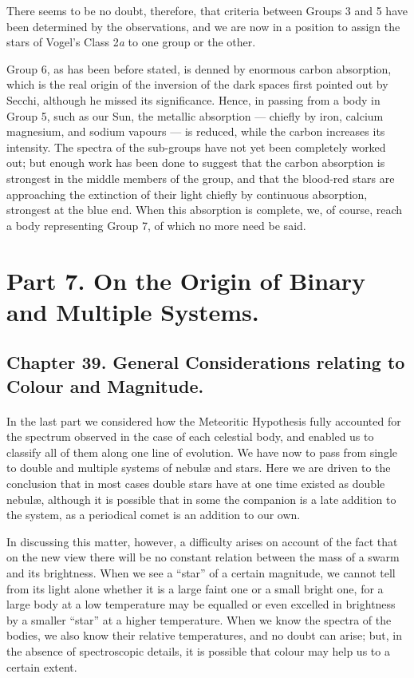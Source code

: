 \documentclass[a4paper, 12pt, oneside, polutonikogreek, english]{article}
\begin{document}
There seems to be no doubt, therefore, that criteria between Groups 3 and 5 have been determined by the observations, and we are now in a position to assign the stars of Vogel's Class 2\emph{a} to one group or the other.

Group 6, as has been before stated, is denned by enormous carbon absorption, which is the real origin of the inversion of the dark spaces first pointed out by Secchi, although he missed its significance. Hence, in passing from a body in Group 5, such as our Sun, the metallic absorption --- chiefly by iron, calcium magnesium, and sodium vapours --- is reduced, while the carbon increases its intensity. The spectra of the sub-groups have not yet been completely worked out; but enough work has been done to suggest that the carbon absorption is strongest in the middle members of the group, and that the blood-red stars are approaching the extinction of their light chiefly by continuous absorption, strongest at the blue end. When this absorption is complete, we, of course, reach a body representing Group 7, of which no more need be said.
\clearpage
\section{Part 7. On the Origin of Binary and Multiple Systems.}
\subsection{Chapter 39. General Considerations relating to Colour and Magnitude.}
\paragraph{}
In the last part we considered how the Meteoritic Hypothesis fully accounted for the spectrum observed in the case of each celestial body, and enabled us to classify all of them along one line of evolution. We have now to pass from single to double and multiple systems of nebulæ and stars. Here we are driven to the conclusion that in most cases double stars have at one time existed as double nebulæ, although it is possible that in some the companion is a late addition to the system, as a periodical comet is an addition to our own.

In discussing this matter, however, a difficulty arises on account of the fact that on the new view there will be no constant relation between the mass of a swarm and its brightness. When we see a ``star'' of a certain magnitude, we cannot tell from its light alone whether it is a large faint one or a small bright one, for a large body at a low temperature may be equalled or even excelled in brightness by a smaller ``star'' at a higher temperature. When we know the spectra of the bodies, we also know their relative temperatures, and no doubt can arise; but, in the absence of spectroscopic details, it is possible that colour may help us to a certain extent.
\end{document}
